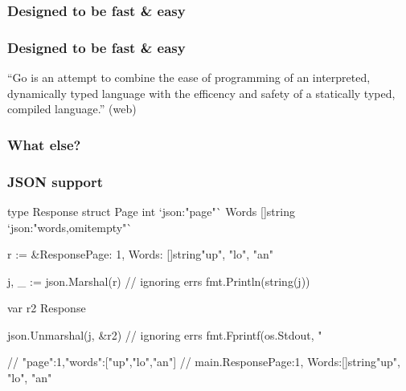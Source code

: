 \documentclass[compress,t,11pt]{beamer}
\begin{document}
\begin{frame}
    \frametitle{Designed to be fast \& easy}
    \vspace{\baselineskip}
    \vspace{\baselineskip}
\end{frame}

\begin{frame}
    \frametitle{Designed to be fast \& easy}
    { ``Go is an attempt to combine the ease of 
    programming of an interpreted, dynamically typed language with the 
    efficency and safety of a statically typed, compiled language.'' 
    (web)\\}
\end{frame}

\begin{frame}
    \frametitle{What else?}
    \vspace{\baselineskip}
    \vspace{\baselineskip}
    \vspace{\baselineskip}
    \vspace{\baselineskip}
\end{frame}

\begin{frame}[fragile]
    \frametitle{JSON support}
\begin{golang}
type Response struct {
    Page  int      `json:"page"`
    Words []string `json:"words,omitempty"`
}

r := &Response{Page: 1, Words: []string{"up", "lo", "an"}}

j, _ := json.Marshal(r)              // ignoring errs
fmt.Println(string(j))

var r2 Response

json.Unmarshal(j, &r2)               // ignoring errs
fmt.Fprintf(os.Stdout, "%

// {"page":1,"words":["up","lo","an"]}
// main.Response{Page:1, Words:[]string{"up", "lo", "an"}}
\end{golang}
\end{frame}
\end{document}
